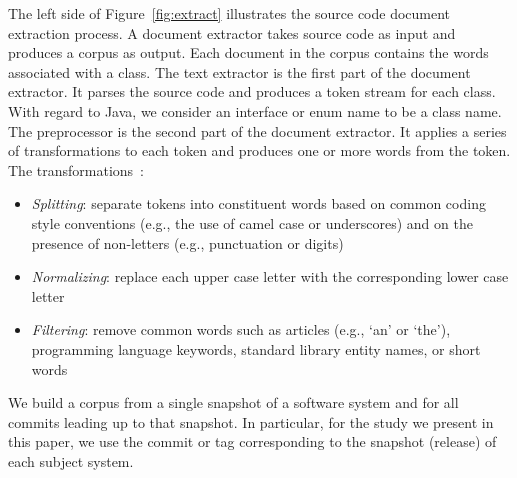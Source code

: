 The left side of Figure~\ref{fig:extract} illustrates the source code document extraction process.
A document extractor takes source code as input and produces a corpus as output.
Each document in the corpus contains the words associated with a class.
The text extractor is the first part of the document extractor.
It parses the source code and produces a token stream for each class.
With regard to Java, we consider an interface or enum name to be a class name.
The preprocessor is the second part of the document extractor.
It applies a series of transformations to each token and
produces one or more words from the token.
The transformations~\cite{Marcus-etal:04,Marcus-Menzies:10}: %
\begin{itemize}
   \item {\it Splitting}: separate tokens into constituent words
         based on common coding style conventions (e.g., the use of camel case or underscores)
         and on the presence of non-letters (e.g., punctuation or digits)
   \item {\it Normalizing}: replace each upper case letter with the corresponding
         lower case letter
   \item {\it Filtering}: remove common words such as articles (e.g., `an' or `the'),
         programming language keywords, standard library entity names, or short words
\end{itemize}
We build a corpus from a single snapshot of a software system and for all
commits leading up to that snapshot.
In particular, for the study we present in this paper,
we use the commit or tag corresponding to the snapshot (release) of each subject system.

